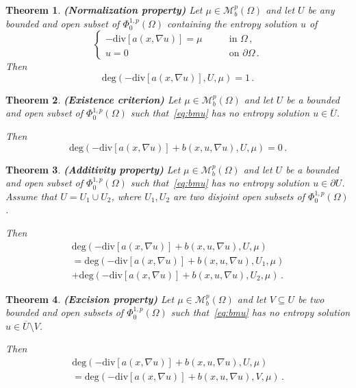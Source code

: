 \documentclass[twoside,reqno]{amsart}
\numberwithin{equation}{section}
\newtheorem{thm}{Theorem}[section]
\theoremstyle{definition}
\begin{document}
%
\begin{thm}
\label{thm:normalization}
\textbf{\emph{(Normalization property)}}
Let $\mu\in\mathcal{M}_b^p(\Omega)$ and let $U$ be any bounded 
and open subset of $\Phi^{1,p}_0(\Omega)$ containing the 
entropy solution $u$ of 
\[
\begin{cases}
- \mathrm{div}[a(x,\nabla u)] = \mu 
&\qquad\text{in $\Omega$}\,,\\
u=0
&\qquad\text{on $\partial\Omega$}\,.
\end{cases}
\]
Then
\[
\mathrm{deg}(- \mathrm{div}[a(x,\nabla u)],U,\mu) = 1\,.
\]
\end{thm}
%
\begin{thm}
\label{thm:existence}
\textbf{\emph{(Existence criterion)}}
Let $\mu\in\mathcal{M}_b^p(\Omega)$ and let $U$ be a bounded 
and open subset of $\Phi^{1,p}_0(\Omega)$ such 
that~\eqref{eq:bmu}
has no entropy solution $u\in\overline{U}$.
\par
Then
\[
\mathrm{deg}(- \mathrm{div}[a(x,\nabla u)] 
+ b(x,u,\nabla u),U,\mu) = 0\,.
\]
\end{thm}
%
\begin{thm}
\label{thm:additivity}
\textbf{\emph{(Additivity property)}}
Let $\mu\in\mathcal{M}_b^p(\Omega)$ and let $U$ be a bounded 
and open subset of $\Phi^{1,p}_0(\Omega)$ such 
that~\eqref{eq:bmu}
has no entropy solution $u\in\partial U$.
Assume that $U=U_1\cup U_2$, where $U_1, U_2$ are two disjoint 
open subsets of $\Phi^{1,p}_0(\Omega)$.
\par
Then
\begin{multline*}
\mathrm{deg}(- \mathrm{div}[a(x,\nabla u)] 
+ b(x,u,\nabla u),U,\mu) \\
= \mathrm{deg}(- \mathrm{div}[a(x,\nabla u)] 
+ b(x,u,\nabla u),U_1,\mu) \\
+ \mathrm{deg}(- \mathrm{div}[a(x,\nabla u)] 
+ b(x,u,\nabla u),U_2,\mu)\,.
\end{multline*}
\end{thm}
%
\begin{thm}
\label{thm:excision}
\textbf{\emph{(Excision property)}}
Let $\mu\in\mathcal{M}_b^p(\Omega)$ and let $V\subseteq U$ be 
two bounded and open subsets of $\Phi^{1,p}_0(\Omega)$ such 
that~\eqref{eq:bmu} has no entropy solution 
$u\in\overline{U}\setminus V$.
\par
Then
\begin{multline*}
 \mathrm{deg}(- \mathrm{div}[a(x,\nabla u)] 
+ b(x,u,\nabla u),U,\mu) \\
= \mathrm{deg}(- \mathrm{div}[a(x,\nabla u)] 
+ b(x,u,\nabla u),V,\mu)\,.
\end{multline*}
\end{thm}
\end{document}
